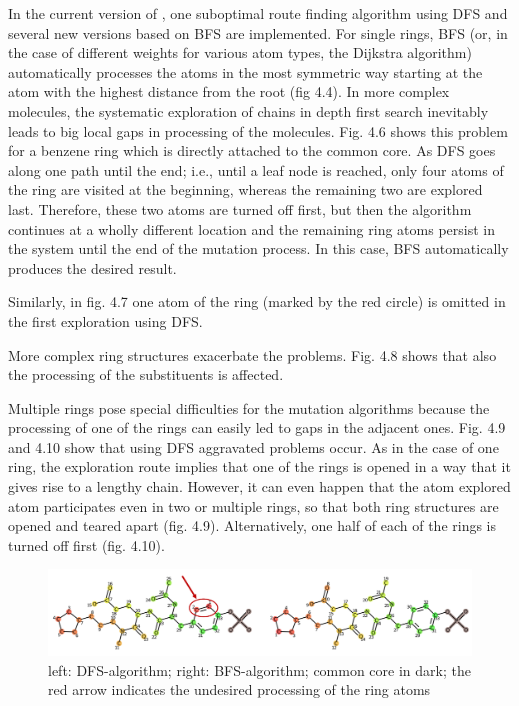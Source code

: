 In the current version of {\trafo}, one suboptimal route finding algorithm using DFS and several new versions based on BFS are implemented.
For single rings, BFS (or, in the case of different weights for various atom types, the Dijkstra algorithm) automatically processes the atoms in the most symmetric way starting at the atom with the highest distance from the root (fig 4.4).
In more complex molecules, the systematic exploration of chains in
depth first search inevitably leads to big local gaps in processing
of the molecules. Fig. 4.6 shows this problem for a benzene ring which
is directly attached to the common core. As DFS goes along one path
until the end; i.e., until a leaf node is reached, only four atoms of the
ring are visited at the beginning, whereas the remaining two are explored
last. Therefore, these two atoms are turned off first, but then the
algorithm continues at a wholly different location and the remaining
ring atoms persist in the system until the end of the mutation process.
In this case, BFS automatically produces the desired result. 

Similarly, in fig. 4.7 one atom of the ring (marked by the red circle)
is omitted in the first exploration using DFS.

More complex ring structures exacerbate the problems. Fig. 4.8 shows that also the processing of the substituents is affected.

Multiple rings pose special difficulties for the mutation algorithms because
the processing of one of the rings can easily led to gaps in the adjacent
ones. Fig. 4.9 and 4.10 show that using DFS aggravated problems occur.
As in the case of one ring, the exploration route implies that one
of the rings is opened in a way that it gives rise to a lengthy chain.
However, it can even happen that the atom explored atom participates
even in two or multiple rings, so that both ring structures are opened
and teared apart (fig. 4.9). Alternatively, one half of each of the
rings is turned off first (fig. 4.10). 

\begin{figure}
\includegraphics[scale=1.5]{simple_ring_exampledfs2}\caption{left: DFS-algorithm; right: BFS-algorithm; common core in dark; the
red arrow indicates the undesired processing of the ring atoms }

\end{figure}

